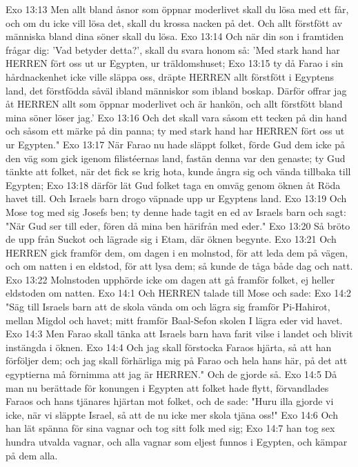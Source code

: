 Exo 13:13  Men allt bland åsnor som öppnar moderlivet skall du lösa med ett får, och om du icke vill lösa det, skall du krossa nacken på det. Och allt förstfött av människa bland dina söner skall du lösa.
Exo 13:14  Och när din son i framtiden frågar dig: 'Vad betyder detta?', skall du svara honom så: 'Med stark hand har HERREN fört oss ut ur Egypten, ur träldomshuset;
Exo 13:15  ty då Farao i sin hårdnackenhet icke ville släppa oss, dräpte HERREN allt förstfött i Egyptens land, det förstfödda såväl ibland människor som ibland boskap. Därför offrar jag åt HERREN allt som öppnar moderlivet och är hankön, och allt förstfött bland mina söner löser jag.'
Exo 13:16  Och det skall vara såsom ett tecken på din hand och såsom ett märke på din panna; ty med stark hand har HERREN fört oss ut ur Egypten."
Exo 13:17  När Farao nu hade släppt folket, förde Gud dem icke på den väg som gick igenom filistéernas land, fastän denna var den genaste; ty Gud tänkte att folket, när det fick se krig hota, kunde ångra sig och vända tillbaka till Egypten;
Exo 13:18  därför lät Gud folket taga en omväg genom öknen åt Röda havet till. Och Israels barn drogo väpnade upp ur Egyptens land.
Exo 13:19  Och Mose tog med sig Josefs ben; ty denne hade tagit en ed av Israels barn och sagt: "När Gud ser till eder, fören då mina ben härifrån med eder."
Exo 13:20  Så bröto de upp från Suckot och lägrade sig i Etam, där öknen begynte.
Exo 13:21  Och HERREN gick framför dem, om dagen i en molnstod, för att leda dem på vägen, och om natten i en eldstod, för att lysa dem; så kunde de tåga både dag och natt.
Exo 13:22  Molnstoden upphörde icke om dagen att gå framför folket, ej heller eldstoden om natten.
Exo 14:1  Och HERREN talade till Mose och sade:
Exo 14:2  "Säg till Israels barn att de skola vända om och lägra sig framför Pi-Hahirot, mellan Migdol och havet; mitt framför Baal-Sefon skolen I lägra eder vid havet.
Exo 14:3  Men Farao skall tänka att Israels barn hava farit vilse i landet och blivit instängda i öknen.
Exo 14:4  Och jag skall förstocka Faraos hjärta, så att han förföljer dem; och jag skall förhärliga mig på Farao och hela hans här, på det att egyptierna må förnimma att jag är HERREN." Och de gjorde så.
Exo 14:5  Då man nu berättade för konungen i Egypten att folket hade flytt, förvandlades Faraos och hans tjänares hjärtan mot folket, och de sade: "Huru illa gjorde vi icke, när vi släppte Israel, så att de nu icke mer skola tjäna oss!"
Exo 14:6  Och han lät spänna för sina vagnar och tog sitt folk med sig;
Exo 14:7  han tog sex hundra utvalda vagnar, och alla vagnar som eljest funnos i Egypten, och kämpar på dem alla.
